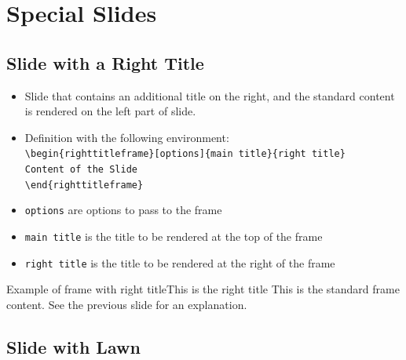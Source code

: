 \documentclass[english,sectioncirclenumberstyle]{ciadbeamer}
\begin{document}
\section{Special Slides}
\tableofcontentslide[sectionstyle={show/shaded},subsectionstyle={show/show/hide},subsubsectionstyle={hide/hide/hide/hide}]

\subsection{Slide with a Right Title}

\begin{frame}{\subsecname}
	\begin{itemize}
	\item Slide that contains an additional title on the right, and the standard content is rendered on the left part of slide.
	\item Definition with the following environment: \\
		\texttt{{\textbackslash}begin\{righttitleframe\}[options]\{main title\}\{right title\}} \\
		\texttt{Content of the Slide} \\
		\texttt{{\textbackslash}end\{righttitleframe\}}
	\item \texttt{options} are options to pass to the frame
	\item \texttt{main title} is the title to be rendered at the top of the frame
	\item \texttt{right title} is the title to be rendered at the right of the frame
	\end{itemize}
\end{frame}

\begin{righttitleframe}{Example of frame with right title}{This is the right title}
	This is the standard frame content. See the previous slide for an explanation.
\end{righttitleframe}

\subsection{Slide with Lawn}
\end{document}
